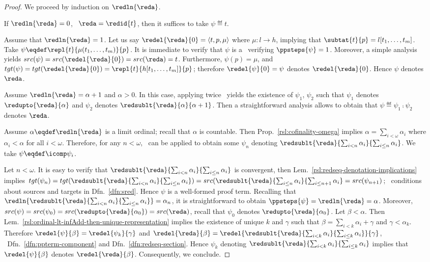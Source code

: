 \begin{proof}
We proceed by induction on $\redln{\reda}$.

If $\redln{\reda} = 0$, \ie\ $\reda = \redid{t}$, then it suffices to take $\psi \eqdef t$.

Assume that $\redln{\reda} = 1$. Let us say $\redel{\reda}{0} = \langle t, p, \mu \rangle$ where $\mu: l \to h$, implying that $\subtat{t}{p} = l[t_1, \ldots, t_m]$.
Take $\psi \eqdef \repl{t}{\mu(t_1, \ldots, t_m)}{p}$.
It is immediate to verify that $\psi$ is a \ppterm\ verifying $\ppsteps{\psi} = 1$. Moreover, a simple analysis yields $src(\psi) = src(\redel{\reda}{0}) = src(\reda) = t$.
Furthermore, $\psi(p) = \mu$, and $tgt(\psi) = tgt(\redel{\reda}{0}) = \repl{t}{h[t_1, \ldots, t_m]}{p}$; therefore $\redel{\psi}{0} = \psi$ denotes $\redel{\reda}{0}$. Hence $\psi$ denotes $\reda$.

Assume $\redln{\reda} = \alpha+1$ and $\alpha > 0$. 
In this case, applying twice \ih\ yields the existence of $\psi_1$, $\psi_2$ such that $\psi_1$ denotes $\redupto{\reda}{\alpha}$ and $\psi_2$ denotes $\redsublt{\reda}{\alpha}{\alpha+1}$.
Then a straightforward analysis allows to obtain that $\psi \eqdef \psi_1 \comp \psi_2$ denotes $\reda$.

Assume $\alpha \eqdef \redln{\reda}$ is a limit ordinal; recall that $\alpha$ is countable. Then Prop.~\ref{rsl:cofinality-omega} implies $\alpha = \sum_{i < \omega} \alpha_i$ where $\alpha_i < \alpha$ for all $i < \omega$.
Therefore, for any $n < \omega$, \ih\ can be applied to obtain some $\psi_n$ denoting $\redsublt{\reda}{\sum_{i < n} \alpha_i}{\sum_{i \leq n} \alpha_i}$.
We take $\psi \eqdef \icomp \psi_i$.

Let $n < \omega$. It is easy to verify that $\redsublt{\reda}{\sum_{i < n} \alpha_i}{\sum_{i \leq n} \alpha_i}$ is convergent, then Lem.~\ref{rsl:redseq-denotation-implications} implies 
$tgt(\psi_n) 
    = tgt(\redsublt{\reda}{\sum_{i < n} \alpha_i}{\sum_{i \leq n} \alpha_i})
		= src(\redsublt{\reda}{\sum_{i \leq n} \alpha_i}{\sum_{i \leq n+1} \alpha_i}
		= src(\psi_{n+1})$; \confer\ conditions about sources and targets in Dfn.~\ref{dfn:sred}.
Hence $\psi$ is a well-formed proof term.
Recalling that $\redln{\redsublt{\reda}{\sum_{i < n} \alpha_i}{\sum_{i \leq n} \alpha_i}} = \alpha_n$, it is straightforward to obtain $\ppsteps{\psi} = \redln{\reda} = \alpha$.
Moreover, $src(\psi) = src(\psi_0) = src(\redupto{\reda}{\alpha_0}) = src(\reda)$, recall that $\psi_0$ denotes $\redupto{\reda}{\alpha_0}$.
Let $\beta < \alpha$. Then Lem.~\ref{rsl:ordinal-lt-infAdd-then-unique-representation} implies the existence of unique $k$ and $\gamma$ such that $\beta = \sum_{i < k} \alpha_i + \gamma$ and $\gamma < \alpha_k$.
Therefore $\redel{\psi}{\beta} = \redel{\psi_k}{\gamma}$ and $\redel{\reda}{\beta} = \redel{\redsublt{\reda}{\sum_{i<k} \alpha_i}{\sum_{i \leq k} \alpha_i}}{\gamma}$, \confer\ Dfn.~\ref{dfn:ppterm-component} and Dfn.~\ref{dfn:redseq-section}.
Hence $\psi_k$ denoting $\redsublt{\reda}{\sum_{i<k} \alpha_i}{\sum_{i \leq k} \alpha_i}$ implies that $\redel{\psi}{\beta}$ denotes $\redel{\reda}{\beta}$.
Consequently, we conclude.
\end{proof}











